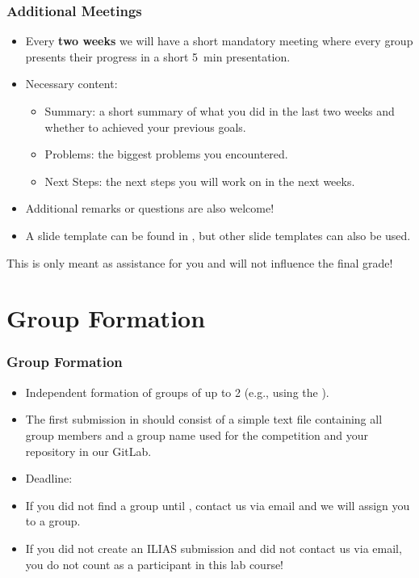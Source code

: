 \begin{frame}
	\frametitle{Additional Meetings}
	\begin{itemize}
		\item Every \textbf{two weeks} we will have a short mandatory meeting where every group presents their progress in a short \SI{5}{\minute} presentation.
		\item Necessary content: 
		\begin{itemize}
			\item Summary: a short summary of what you did in the last two weeks and whether to achieved your previous goals.
			\item Problems: the biggest problems you encountered. 
			\item Next Steps: the next steps you will work on in the next weeks. 
		\end{itemize}
		\item Additional remarks or questions are also welcome!
		\item A slide template can be found in , but other slide templates can also be used. 
	\end{itemize}
	\vfill
	\DisplayRightArrow This is only meant as assistance for you and will not influence the final grade!
\end{frame}

\section*{Group Formation}
\begin{frame}[fragile]
  \frametitle{Group Formation}
  \begin{itemize}
      \item Independent formation of groups of up to 2 (e.g., using the ).
      \item The first submission in  should consist of a simple text file containing all group members and a group name used for the competition and your repository in our GitLab.
      \item Deadline: \textbf{\dateDeadlinePhaseZero}
      \item If you did not find a group until \dateDeadlinePhaseZero, contact us via email and we will assign you to a group.
      \item If you did not create an ILIAS submission and did not contact us via email, you do not count as a participant in this lab course!
  \end{itemize}
\end{frame}

